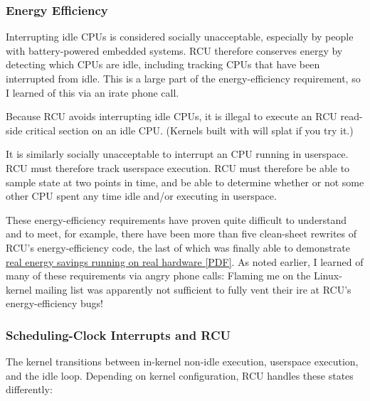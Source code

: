 \subsubsection{Energy Efficiency}

Interrupting idle CPUs is considered socially unacceptable, especially
by people with battery-powered embedded systems.
RCU therefore conserves
energy by detecting which CPUs are idle, including tracking CPUs that
have been interrupted from idle.
This is a large part of the
energy-efficiency requirement, so I learned of this via an irate phone
call.

Because RCU avoids interrupting idle CPUs, it is illegal to execute an
RCU read-side critical section on an idle CPU.
(Kernels built with
 will splat if you try it.)

It is similarly socially unacceptable to interrupt an  CPU
running in userspace.
RCU must therefore track  userspace
execution.
RCU must therefore be able to sample state at two points in
time, and be able to determine whether or not some other CPU spent any
time idle and/or executing in userspace.

These energy-efficiency requirements have proven quite difficult to
understand and to meet, for example, there have been more than five
clean-sheet rewrites of RCU's energy-efficiency code, the last of which
was finally able to demonstrate
\href{http://www.rdrop.com/users/paulmck/realtime/paper/AMPenergy.2013.04.19a.pdf}{real energy savings running on real hardware [PDF]}.
As noted earlier, I learned of many of these requirements via angry
phone calls:
Flaming me on the Linux-kernel mailing list was apparently
not sufficient to fully vent their ire at RCU's energy-efficiency bugs!


\subsubsection{Scheduling-Clock Interrupts and RCU}

The kernel transitions between in-kernel non-idle execution, userspace
execution, and the idle loop.
Depending on kernel configuration, RCU
handles these states differently:

